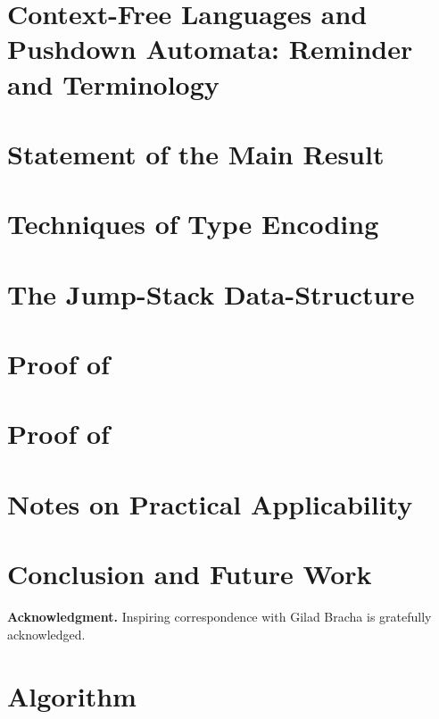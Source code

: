 \documentclass[a4paper,USenglish]{lipics}
\begin{document}
\section{Context-Free Languages and Pushdown Automata: Reminder and Terminology}
\label{Section:pushdown}


\section{Statement of the Main Result} 
\label{Section:result}


\section{Techniques of Type Encoding}
\label{Section:toolkit}


\section{The Jump-Stack Data-Structure}
\label{Section:jump}


\section{Proof of }
\label{Section:proof}


\section{Proof of }
\label{Section:prefix}


\section{Notes on Practical Applicability}
\label{Section:applicability}


\section{Conclusion and Future Work}
\label{Section:zz}


\textbf{Acknowledgment.}
Inspiring correspondence with Gilad Bracha is gratefully acknowledged. 


\small


\clearpage
\appendix
\section{Algorithm}

\end{document}

